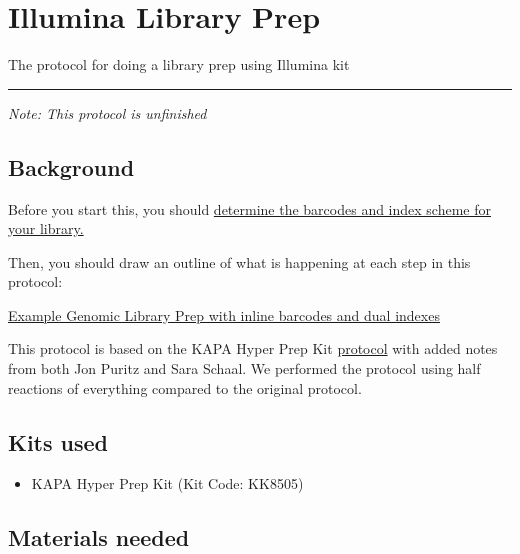 \documentclass[
  letterpaper,
  DIV=11,
  numbers=noendperiod]{scrreprt}
\providecommand{\tightlist}{%
  \setlength{\itemsep}{0pt}\setlength{\parskip}{0pt}}\usepackage{longtable,booktabs,array}
\begin{document}
\hypertarget{illumina-library-prep}{%
\chapter{Illumina Library Prep}\label{illumina-library-prep}}

The protocol for doing a library prep using Illumina kit

\begin{center}\rule{0.5\linewidth}{0.5pt}\end{center}

\emph{Note: This protocol is unfinished}

\hypertarget{background}{%
\section*{\texorpdfstring{\textbf{Background}}{Background}}\label{background}}

Before you start this, you should
\href{https://bmford11.github.io/lotterhoslabprotocols/barcodesnindexes/}{determine
the barcodes and index scheme for your library.}

Then, you should draw an outline of what is happening at each step in
this protocol:

\href{https://docs.google.com/document/d/1xr99sMucP-x2rK6K61vtGHKNahl9UYFwh_oEb0AtHX8/edit}{Example
Genomic Library Prep with inline barcodes and dual indexes}

This protocol is based on the KAPA Hyper Prep Kit
\href{https://rochesequencingstore.com/wp-content/uploads/2017/10/KAPA-HyperPrep-Kit_KR0961-\%E2\%80\%93-v7.19.pdf}{protocol}
with added notes from both Jon Puritz and Sara Schaal. We performed the
protocol using half reactions of everything compared to the original
protocol.

\hypertarget{kits-used}{%
\section*{\texorpdfstring{\textbf{Kits
used}}{Kits used}}\label{kits-used}}

\begin{itemize}
\tightlist
\item
  KAPA Hyper Prep Kit (Kit Code: KK8505)
\end{itemize}

\hypertarget{materials-needed}{%
\section*{\texorpdfstring{\textbf{Materials
needed}}{Materials needed}}\label{materials-needed}}
\end{document}

